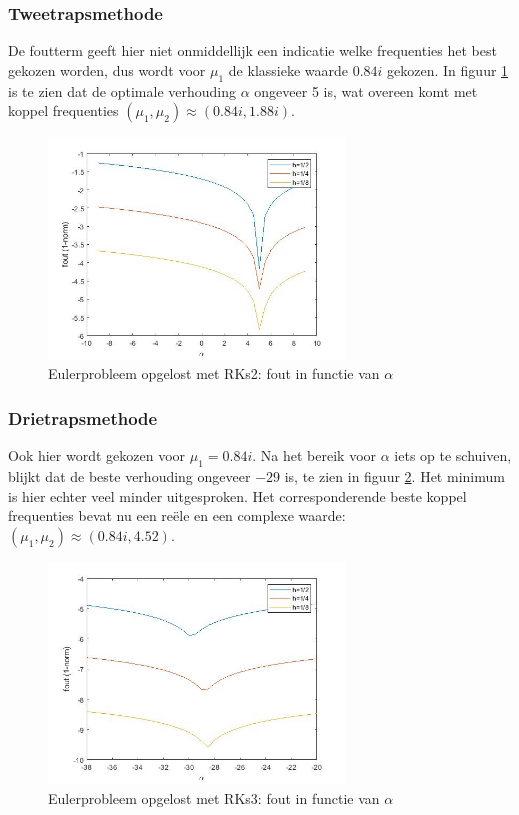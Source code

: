 \documentclass[12pt]{article}
\begin{document}
\subsubsection{Tweetrapsmethode}
De foutterm geeft hier niet onmiddellijk een indicatie welke frequenties het best gekozen worden, dus wordt voor \(\mu_1\) de klassieke waarde \(0.84i\) gekozen. In figuur \ref{fig:euleralphasrks2} is te zien dat de optimale verhouding \(\alpha\) ongeveer 5 is, wat overeen komt met koppel frequenties \((\mu_1,\mu_2)\approx(0.84i,1.88i)\).
\begin{figure}[H]
    \centering
    \includegraphics[width=0.7\textwidth]{euler_RKs2.jpg}
    \caption{Eulerprobleem opgelost met RKs2: fout in functie van \(\alpha\)}
    \label{fig:euleralphasrks2}
\end{figure}

\subsubsection{Drietrapsmethode}
Ook hier wordt gekozen voor \(\mu_1=0.84i\). Na het bereik voor \(\alpha\) iets op te schuiven, blijkt dat de beste verhouding ongeveer \(-29\) is, te zien in figuur \ref{fig:euleralphasrks3}. Het minimum is hier echter veel minder uitgesproken. Het corresponderende beste koppel frequenties bevat nu een reële en een complexe waarde: \((\mu_1,\mu_2)\approx(0.84i,4.52)\).
\begin{figure}[H]
    \centering
    \includegraphics[width=0.7\textwidth]{euler_RKs3.jpg}
    \caption{Eulerprobleem opgelost met RKs3: fout in functie van \(\alpha\)}
    \label{fig:euleralphasrks3}
\end{figure}
\end{document}
